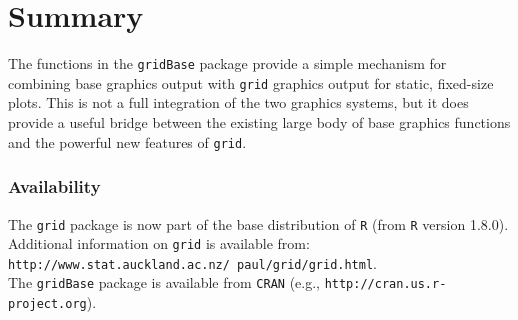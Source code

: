 \documentclass[a4paper]{article}
\newcommand{\grid}{{\tt grid}}
\newcommand{\gridBase}{{\tt gridBase}}
\newcommand{\R}{{\tt R}}
\begin{document}
\section*{Summary}

The functions in the \gridBase{} package provide a simple mechanism
for combining base graphics output with \grid{} graphics output
for static, fixed-size plots.  This is not a full integration
of the two graphics systems, but it does provide a useful bridge
between the existing large body of base graphics functions and the
powerful new features of \grid{}.


\subsubsection*{Availability}

The \grid{} package is now part of the base distribution of \R{}
(from \R{} version 1.8.0).  \\
Additional information on \grid{}
is available from:\\
 {\tt http://www.stat.auckland.ac.nz/~paul/grid/grid.html}. \\
The \gridBase{} package
is available from \verb|CRAN| (e.g., {\tt http://cran.us.r-project.org}).



\end{document}
